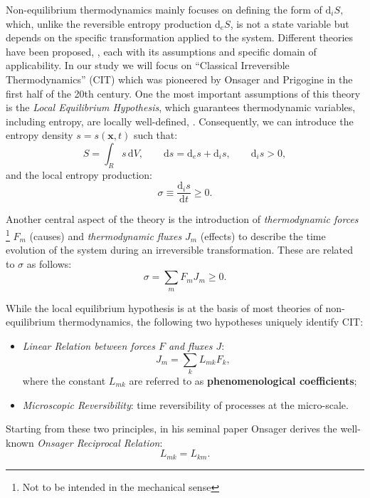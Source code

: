 \documentclass[runningheads]{llncs}
\renewcommand{\d}{\ensuremath{\text{d}}}
\begin{document}
Non-equilibrium thermodynamics mainly focuses on defining the form of $\d_i S$, which, unlike the reversible entropy production $\d_e S$, is not a state variable but depends on the specific transformation applied to the system. 
Different theories have been proposed, \cite{NET}, each with its assumptions and specific domain of applicability. In our study we will focus on \textquotedblleft Classical Irreversible Thermodynamics'' (CIT) which was pioneered by Onsager \cite{onsager} and Prigogine \cite{prigogine} in the first half of the 20th century. One the most important assumptions of this theory is the \textit{Local Equilibrium Hypothesis}, which guarantees thermodynamic variables, including entropy, are locally well-defined, \cite{NET}. 
Consequently, we can introduce the entropy density $s=s(\mathbf{x},t)$ such that:
\begin{equation}
S = \int_{R} s \,\d V, \qquad \d s = \d_e s + \d_is, \qquad \d_is > 0, 
\end{equation}
and the local entropy production:
\begin{equation}
\sigma \equiv \frac{\d_i s}{\d t} \geq 0.
\end{equation}

Another central aspect of the theory is the introduction of \textit{thermodynamic forces} \footnote{Not to be intended in the mechanical sense} $F_m$ (causes) and \textit{thermodynamic fluxes} $J_m$ (effects) to describe the time evolution of the system during an irreversible transformation. These are related to $\sigma$ as follows:
\begin{equation}
\sigma = \sum_m F_m J_m\geq 0.
\label{2law}
\end{equation}

While the local equilibrium hypothesis is at the basis of most theories of non-equilibrium thermodynamics, the following two hypotheses uniquely identify CIT:
\begin{itemize}
	\item[1.] \textit{Linear Relation between forces $F$ and fluxes $J$}:
	\begin{equation}
	J_m = \sum_k L_{mk} F_k,\label{lin}
	\end{equation}
	where the constant $L_{mk}$ are referred to as \textbf{phenomenological coefficients};
	\item[2.] \textit{Microscopic Reversibility}: time reversibility of processes at the micro-scale. 
\end{itemize}

Starting from these two principles, in his seminal paper \cite{onsager} Onsager derives the well-known \textit{Onsager Reciprocal Relation}:
\begin{equation}
L_{mk}=L_{km}.
\end{equation}
\end{document}
